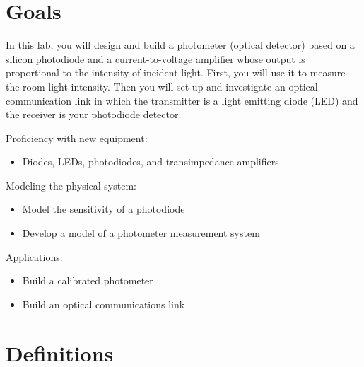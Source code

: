 \documentclass[10pt]{PhysLab1C} %
\begin{document}
\maketitle %


\thispagestyle{firstpage} %


\section{Goals}

In this lab, you will design and build a photometer (optical detector)
based on a silicon photodiode and a current-to-voltage amplifier whose
output is proportional to the intensity of incident light. First, you
will use it to measure the room light intensity. Then you will set up
and investigate an optical communication link in which the transmitter
is a light emitting diode (LED) and the receiver is your photodiode
detector.

Proficiency with new equipment:

\begin{itemize}
\item
  Diodes, LEDs, photodiodes, and transimpedance amplifiers
\end{itemize}

Modeling the physical system:

\begin{itemize}
\item
  Model the sensitivity of a photodiode
\item
  Develop a model of a photometer measurement system
\end{itemize}

Applications:

\begin{itemize}
\item
  Build a calibrated photometer
\item
  Build an optical communications link
\end{itemize}


\section{Definitions}
\end{document}

